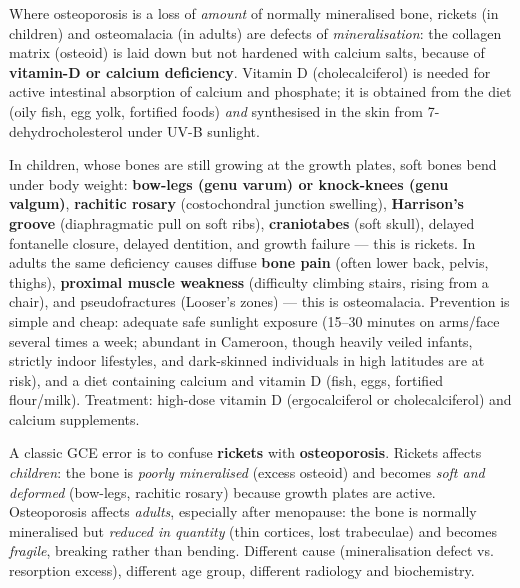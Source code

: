 \documentclass[11pt]{article}
\newcommand{\cle}[1]{{\popxbold\color{popdark}#1}}
\newcounter{popsec}
\newcounter{popsub}
\newcommand{\courssub}[1]{%
  \stepcounter{popsub}%
  \par\vspace{9pt}\noindent{\popxbold\fontsize{11.5}{13}\selectfont\color{popink}{\color{poporange}\thepopsec.\thepopsub}\hspace{6pt}#1}\par\nopagebreak\vspace{4pt}
}
\begin{document}
Where osteoporosis is a loss of \emph{amount} of normally mineralised bone, \cle{rickets} (in children) and \cle{osteomalacia} (in adults) are defects of \emph{mineralisation}: the collagen matrix (osteoid) is laid down but not hardened with calcium salts, because of \textbf{vitamin-D or calcium deficiency}. Vitamin D (cholecalciferol) is needed for active intestinal absorption of calcium and phosphate; it is obtained from the diet (oily fish, egg yolk, fortified foods) \emph{and} synthesised in the skin from 7-dehydrocholesterol under UV-B sunlight.

In children, whose bones are still growing at the growth plates, soft bones bend under body weight: \textbf{bow-legs (genu varum) or knock-knees (genu valgum)}, \textbf{rachitic rosary} (costochondral junction swelling), \textbf{Harrison's groove} (diaphragmatic pull on soft ribs), \textbf{craniotabes} (soft skull), delayed fontanelle closure, delayed dentition, and growth failure — this is rickets. In adults the same deficiency causes diffuse \textbf{bone pain} (often lower back, pelvis, thighs), \textbf{proximal muscle weakness} (difficulty climbing stairs, rising from a chair), and pseudofractures (Looser's zones) — this is osteomalacia. Prevention is simple and cheap: adequate safe sunlight exposure (15--30 minutes on arms/face several times a week; abundant in Cameroon, though heavily veiled infants, strictly indoor lifestyles, and dark-skinned individuals in high latitudes are at risk), and a diet containing calcium and vitamin D (fish, eggs, fortified flour/milk). Treatment: high-dose vitamin D (ergocalciferol or cholecalciferol) and calcium supplements.

\begin{attention}
A classic GCE error is to confuse \textbf{rickets} with \textbf{osteoporosis}. Rickets affects \emph{children}: the bone is \emph{poorly mineralised} (excess osteoid) and becomes \emph{soft and deformed} (bow-legs, rachitic rosary) because growth plates are active. Osteoporosis affects \emph{adults}, especially after menopause: the bone is normally mineralised but \emph{reduced in quantity} (thin cortices, lost trabeculae) and becomes \emph{fragile}, breaking rather than bending. Different cause (mineralisation defect vs. resorption excess), different age group, different radiology and biochemistry.
\end{attention}

\courssub{Muscular disorders}
\end{document}
